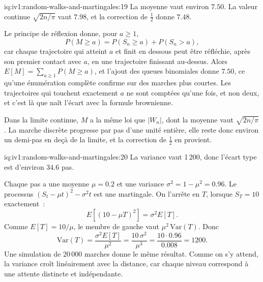 \begin{solution}{iq:iv1:random-walks-and-martingales:19}
La moyenne vaut environ $7.50$. La valeur continue $\sqrt{2n/\pi}$ vaut $7.98$, et la correction de $\tfrac12$ donne $7.48$.

Le principe de réflexion donne, pour $a \ge 1$,
\[
P(M \ge a) = P(S_n \ge a) + P(S_n > a),
\]
car chaque trajectoire qui atteint $a$ et finit en dessous peut être réfléchie, après son premier contact avec $a$, en une trajectoire finissant au-dessus. Alors $E[M] = \sum_{a \ge 1} P(M \ge a)$, et l'ajout des queues binomiales donne $7.50$, ce qu'une énumération complète confirme sur des marches plus courtes. Les trajectoires qui touchent exactement $a$ ne sont comptées qu'une fois, et non deux, et c'est là que naît l'écart avec la formule brownienne.

Dans la limite continue, $M$ a la même loi que $|W_n|$, dont la moyenne vaut $\sqrt{2n/\pi}$. La marche discrète progresse par pas d'une unité entière, elle reste donc environ un demi-pas en deçà de la limite, et la correction de $\tfrac12$ en provient.

\end{solution}

\begin{solution}{iq:iv1:random-walks-and-martingales:20}
La variance vaut 1\,200, donc l'écart type est d'environ $34.6$ pas.

Chaque pas a une moyenne $\mu = 0.2$ et une variance $\sigma^2 = 1 - \mu^2 = 0.96$. Le processus $(S_t - \mu t)^2 - \sigma^2 t$ est une martingale. On l'arrête en $T$, lorsque $S_T = 10$ exactement~:
\[
E[(10 - \mu T)^2] = \sigma^2 E[T].
\]
Comme $E[T] = 10/\mu$, le membre de gauche vaut $\mu^2\,\mathrm{Var}(T)$. Donc
\[
\mathrm{Var}(T) = \frac{\sigma^2 E[T]}{\mu^2} = \frac{10\,\sigma^2}{\mu^3} = \frac{10 \cdot 0.96}{0.008} = 1200.
\]
Une simulation de 20\,000 marches donne le même résultat. Comme on s'y attend, la variance croît linéairement avec la distance, car chaque niveau correspond à une attente distincte et indépendante.

\end{solution}

